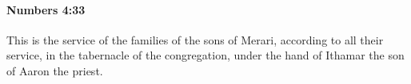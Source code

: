 
		\paragraph{Numbers 4:33} %
			\label{NUMBERS-4-33}

			This is the service of the families of the sons of Merari, according to all their service, in the tabernacle of the congregation, under the hand of Ithamar the son of Aaron the priest.


